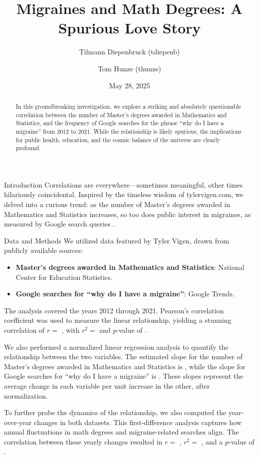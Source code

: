 \documentclass{article}
\title{\textbf{Migraines and Math Degrees: A Spurious Love Story}}
\author{Tilmann Diepenbruck (tdiepenb) \and Tom Hunze (thunze)}
\date{May 28, 2025}
\begin{document}
\maketitle

\begin{abstract}
  In this groundbreaking investigation, we explore a striking and absolutely questionable correlation between the number of Master's degrees awarded in Mathematics and Statistics, and the frequency of Google searches for the phrase ``why do I have a migraine'' from 2012 to 2021. While the relationship is likely spurious, the implications for public health, education, and the cosmic balance of the universe are clearly profound.
\end{abstract}

\begin{section}{Introduction}
 Correlations are everywhere---sometimes meaningful, other times hilariously coincidental. Inspired by the timeless wisdom of tylervigen.com, we delved into a curious trend: as the number of Master's degrees awarded in Mathematics and Statistics increases, so too does public interest in migraines, as measured by Google search queries \cite{vigen}.
\end{section}

\begin{section}{Data and Methods}
 We utilized data featured by Tyler Vigen, drawn from publicly available sources:
 \begin{itemize}
   \item \textbf{Master's degrees awarded in Mathematics and Statistics}: National Center for Education Statistics. \cite{nc_es}
   \item \textbf{Google searches for ``why do I have a migraine''}: Google Trends. \cite{google_trends}
 \end{itemize}
 The analysis covered the years 2012 through 2021. Pearson's correlation coefficient was used to measure the linear relationship, yielding a stunning correlation of $r =$ , with $r^2 =$  and $p$-value of .

 We also performed a normalized linear regression analysis to quantify the relationship between the two variables. The estimated slope for the number of Master's degrees awarded in Mathematics and Statistics is , while the slope for Google searches for ``why do I have a migraine'' is . These slopes represent the average change in each variable per unit increase in the other, after normalization.

 To further probe the dynamics of the relationship, we also computed the year-over-year changes in both datasets. This first-difference analysis captures how annual fluctuations in math degrees and migraine-related searches align. The correlation between these yearly changes resulted in $r =$ , $r^2 =$ , and a $p$-value of .
\end{section}
\end{document}
